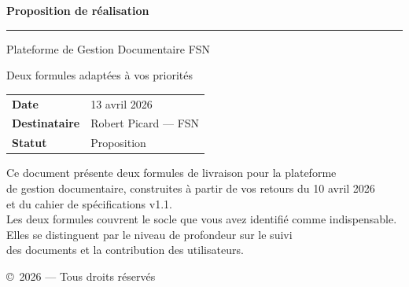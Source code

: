 \documentclass[a4paper,12pt,french]{article}
\begin{document}
\begin{titlepage}
\begin{center}

\vspace*{1.5cm}

{\LARGE\bfseries\textcolor{darkbg}{Proposition de réalisation}}

\vspace{0.4cm}

{\Large\textcolor{accentgreen}{\rule{4cm}{2pt}}}

\vspace{0.8cm}

{\Large\textcolor{maintext}{Plateforme de Gestion Documentaire FSN}}

\vspace{0.3cm}

{\large\textcolor{maintext}{Deux formules adaptées à vos priorités}}

\vspace{2cm}

\begin{tabular}{ll}
\textbf{Date}           & 13 avril 2026 \\
\textbf{Destinataire}   & Robert Picard — FSN \\
\textbf{Statut}         & Proposition \\
\end{tabular}

\vspace{2cm}

{\small\textcolor{maintext}{
Ce document présente deux formules de livraison pour la plateforme\\
de gestion documentaire, construites à partir de vos retours du 10 avril 2026\\
et du cahier de spécifications v1.1.\\[0.5em]
Les deux formules couvrent le socle que vous avez identifié comme indispensable.\\
Elles se distinguent par le niveau de profondeur sur le suivi\\
des documents et la contribution des utilisateurs.
}}

\vfill

{\footnotesize\textcolor{maintext}{\copyright\ 2026 — Tous droits réservés}}

\end{center}
\end{titlepage}
\end{document}
